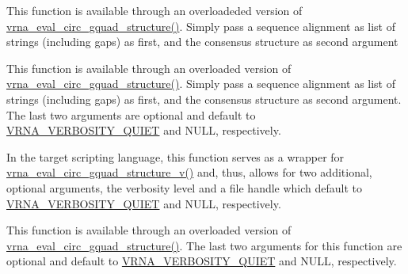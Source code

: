 \begin{DoxyRefList}
\item[\label{wrappers__wrappers000042}%
\Hypertarget{wrappers__wrappers000042}%
Global \mbox{\hyperlink{group__eval_gac673ebb9ae2a29f54d201e2ac5b85540}{vrna\+\_\+eval\+\_\+circ\+\_\+gquad\+\_\+consensus\+\_\+structure}} (const char $\ast$$\ast$alignment, const char $\ast$structure)]This function is available through an overloadeded version of \mbox{\hyperlink{group__eval_ga9dba2fc5d7e6ad1359a7c2f350589c0e}{vrna\+\_\+eval\+\_\+circ\+\_\+gquad\+\_\+structure()}}. Simply pass a sequence alignment as list of strings (including gaps) as first, and the consensus structure as second argument  
\item[\label{wrappers__wrappers000052}%
\Hypertarget{wrappers__wrappers000052}%
Global \mbox{\hyperlink{group__eval_gaecd3e17292a0b3927277434019a5e187}{vrna\+\_\+eval\+\_\+circ\+\_\+gquad\+\_\+consensus\+\_\+structure\+\_\+v}} (const char $\ast$$\ast$alignment, const char $\ast$structure, int verbosity\+\_\+level, F\+I\+LE $\ast$file)]This function is available through an overloaded version of \mbox{\hyperlink{group__eval_ga9dba2fc5d7e6ad1359a7c2f350589c0e}{vrna\+\_\+eval\+\_\+circ\+\_\+gquad\+\_\+structure()}}. Simply pass a sequence alignment as list of strings (including gaps) as first, and the consensus structure as second argument. The last two arguments are optional and default to \mbox{\hyperlink{eval_8h_af4afe19780b61b4962c613bde324128b}{V\+R\+N\+A\+\_\+\+V\+E\+R\+B\+O\+S\+I\+T\+Y\+\_\+\+Q\+U\+I\+ET}} and N\+U\+LL, respectively.  
\item[\label{wrappers__wrappers000038}%
\Hypertarget{wrappers__wrappers000038}%
Global \mbox{\hyperlink{group__eval_ga9dba2fc5d7e6ad1359a7c2f350589c0e}{vrna\+\_\+eval\+\_\+circ\+\_\+gquad\+\_\+structure}} (const char $\ast$string, const char $\ast$structure)]In the target scripting language, this function serves as a wrapper for \mbox{\hyperlink{group__eval_gab96a6c59923ff06c35f8c2fd2c239727}{vrna\+\_\+eval\+\_\+circ\+\_\+gquad\+\_\+structure\+\_\+v()}} and, thus, allows for two additional, optional arguments, the verbosity level and a file handle which default to \mbox{\hyperlink{eval_8h_af4afe19780b61b4962c613bde324128b}{V\+R\+N\+A\+\_\+\+V\+E\+R\+B\+O\+S\+I\+T\+Y\+\_\+\+Q\+U\+I\+ET}} and N\+U\+LL, respectively.  
\item[\label{wrappers__wrappers000048}%
\Hypertarget{wrappers__wrappers000048}%
Global \mbox{\hyperlink{group__eval_gab96a6c59923ff06c35f8c2fd2c239727}{vrna\+\_\+eval\+\_\+circ\+\_\+gquad\+\_\+structure\+\_\+v}} (const char $\ast$string, const char $\ast$structure, int verbosity\+\_\+level, F\+I\+LE $\ast$file)]This function is available through an overloaded version of \mbox{\hyperlink{group__eval_ga9dba2fc5d7e6ad1359a7c2f350589c0e}{vrna\+\_\+eval\+\_\+circ\+\_\+gquad\+\_\+structure()}}. The last two arguments for this function are optional and default to \mbox{\hyperlink{eval_8h_af4afe19780b61b4962c613bde324128b}{V\+R\+N\+A\+\_\+\+V\+E\+R\+B\+O\+S\+I\+T\+Y\+\_\+\+Q\+U\+I\+ET}} and N\+U\+LL, respectively.  

\end{DoxyRefList}
